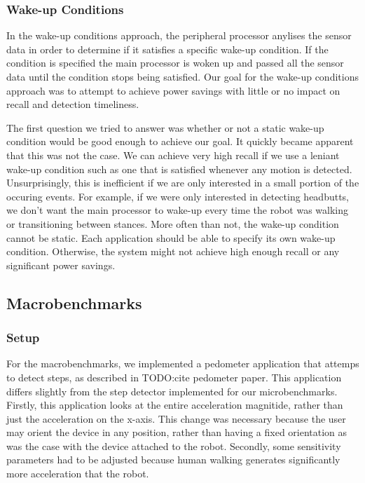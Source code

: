 \subsubsection{Wake-up Conditions}

In the wake-up conditions approach, the peripheral processor anylises the sensor data in order to determine if it satisfies a specific wake-up condition. If the condition is specified the main processor is woken up and passed all the sensor data until the condition stops being satisfied. Our goal for the wake-up conditions approach was to attempt to achieve power savings with little or no impact on recall and detection timeliness. 

The first question we tried to answer was whether or not a static wake-up condition would be good enough to achieve our goal. It quickly became apparent that this was not the case. We can achieve very high recall if we use a leniant wake-up condition such as one that is satisfied whenever any motion is detected. Unsurprisingly, this is inefficient if we are only interested in a small portion of the occuring events. For example, if we were only interested in detecting headbutts, we don't want the main processor to wake-up every time the robot was walking or transitioning between stances. More often than not, the wake-up condition cannot be static. Each application should be able to specify its own wake-up condition. Otherwise, the system might not achieve high enough recall or any significant power savings.



\subsection{Macrobenchmarks}

\subsubsection{Setup}
For the macrobenchmarks, we implemented a pedometer application that attemps to detect steps, as described in TODO:cite pedometer paper. This application differs slightly from the step detector implemented for our microbenchmarks. Firstly, this application looks at the entire acceleration magnitide, rather than just the acceleration on the x-axis. This change was necessary because the user may orient the device in any position, rather than having a fixed orientation as was the case with the device attached to the robot. Secondly, some sensitivity parameters had to be adjusted because human walking generates significantly more acceleration that the robot. 

